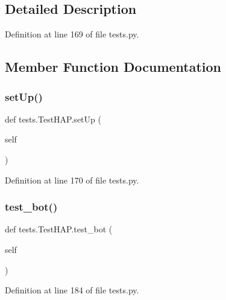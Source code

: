 \subsection{Detailed Description}


Definition at line 169 of file tests.\+py.



\subsection{Member Function Documentation}
\hypertarget{classtests_1_1_test_h_a_p_af8cb941f3ccfbbb75d321f0698b0c7c4}{}\label{classtests_1_1_test_h_a_p_af8cb941f3ccfbbb75d321f0698b0c7c4} 
\subsubsection{\texorpdfstring{set\+Up()}{setUp()}}
{\footnotesize\ttfamily def tests.\+Test\+H\+A\+P.\+set\+Up (\begin{DoxyParamCaption}\item[{}]{self }\end{DoxyParamCaption})}



Definition at line 170 of file tests.\+py.

\hypertarget{classtests_1_1_test_h_a_p_a025dcab851da00576a4fe720785ed1d3}{}\label{classtests_1_1_test_h_a_p_a025dcab851da00576a4fe720785ed1d3} 
\subsubsection{\texorpdfstring{test\+\_\+bot()}{test\_bot()}}
{\footnotesize\ttfamily def tests.\+Test\+H\+A\+P.\+test\+\_\+bot (\begin{DoxyParamCaption}\item[{}]{self }\end{DoxyParamCaption})}



Definition at line 184 of file tests.\+py.

\hypertarget{classtests_1_1_test_h_a_p_a695a9a9a2155b4a385b317b9df263b16}{}\label{classtests_1_1_test_h_a_p_a695a9a9a2155b4a385b317b9df263b16} 
